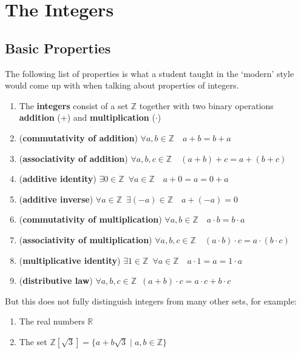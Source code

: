 \documentclass[11pt, oneside]{book}
\theoremstyle{break}
\newcommand{\bb}[1]{\mathbb{#1}}			%
\begin{document}
\chapter{The Integers}

\section{Basic Properties}

The following list of properties is what a student taught in the `modern' style would come up with when talking about properties of integers.

\begin{enumerate}
	\item The \textbf{integers} consist of a set $\bb{Z}$ together with two binary operations \textbf{addition} (+) and \textbf{multiplication} ($\cdot$)
	\item (\textbf{commutativity of addition}) $\forall a, b \in \bb{Z} \quad a + b = b + a$
	\item (\textbf{associativity of addition}) $\forall a, b, c \in \bb{Z} \quad (a + b) + c = a + (b + c)$
	\item (\textbf{additive identity}) $\exists 0 \in \bb{Z} \enspace \forall a \in \bb{Z} \quad a + 0 = a = 0 + a$
	\item (\textbf{additive inverse}) $\forall a \in \bb{Z} \enspace \exists (-a) \in \bb{Z} \quad a + (-a) = 0$
	\item (\textbf{commutativity of multiplication}) $\forall a, b \in \bb{Z} \quad a \cdot b = b \cdot a$
	\item (\textbf{associativity of multiplication}) $\forall a, b, c \in \bb{Z} \quad (a \cdot b) \cdot c = a \cdot (b \cdot c)$
	\item (\textbf{multiplicative identity}) $\exists 1 \in \bb{Z} \enspace \forall a \in \bb{Z} \quad a \cdot 1 = a = 1 \cdot a$
	\item (\textbf{distributive law}) $\forall a, b, c \in \bb{Z} \enspace (a + b) \cdot c = a \cdot c + b \cdot c$
\end{enumerate}

But this does not fully distinguish integers from many other sets, for example:
\begin{enumerate}
	\item The real numbers $\bb{R}$
	\item The set $\bb{Z}[\sqrt{3}] = \{a + b\sqrt{3} \; | \; a, b \in \bb{Z}\}$
	
\end{enumerate}
\end{document}
